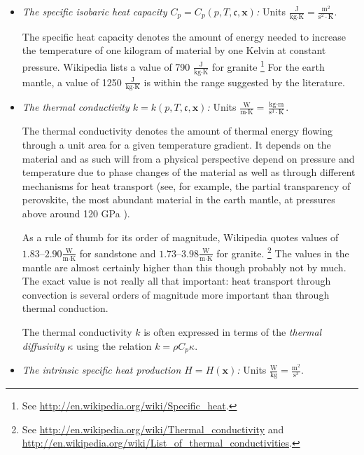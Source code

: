\documentclass{article}
\begin{document}
\begin{itemize}
\item \textit{The specific isobaric heat capacity $C_p=C_p(p,T,\mathfrak c,\mathbf x)$:}
Units $\frac{\textrm{J}}{\textrm{kg}\cdot\textrm{K}} =
  \frac{\textrm{m}^2}{\textrm{s}^2\cdot\textrm{K}}$.

  The specific heat capacity denotes the amount of energy needed to increase
  the temperature of one kilogram of material by one Kelvin at constant pressure.
  Wikipedia lists a value of
  790 $\frac{\textrm{J}}{\textrm{kg}\cdot\textrm{K}}$ for granite%
  \footnote{See \url{http://en.wikipedia.org/wiki/Specific_heat}.}
  For the earth mantle, a value of 1250
  $\frac{\textrm{J}}{\textrm{kg}\cdot\textrm{K}}$ is within the range
  suggested by the literature.


\item \textit{The thermal conductivity $k=k(p,T,\mathfrak c,\mathbf x)$:} Units
  $\frac{\textrm{W}}{\textrm{m}\cdot\textrm{K}}=\frac{\textrm{kg}\cdot\textrm{m}}{\textrm{s}^3\cdot\textrm{K}}$.

  The thermal conductivity denotes the amount of thermal energy flowing
  through a unit area for a given temperature gradient. It depends on the
  material and as such will from a physical perspective depend on pressure and
  temperature due to phase changes of the material as well as through
  different mechanisms for heat transport (see, for example, the partial
  transparency of perovskite, the most abundant
  material in the earth mantle, at pressures above around 120 GPa
  \cite{BRVMFG04}).

  As a rule of thumb for its
  order of magnitude, Wikipedia quotes values of
  $1.83$--$2.90\frac{\textrm{W}}{\textrm{m}\cdot\textrm{K}}$ for sandstone and
  $1.73$--$3.98\frac{\textrm{W}}{\textrm{m}\cdot\textrm{K}}$ for granite.%
  \footnote{See \url{http://en.wikipedia.org/wiki/Thermal_conductivity} and
    \url{http://en.wikipedia.org/wiki/List_of_thermal_conductivities}.} The
  values in the mantle are almost certainly higher than this though probably
  not by much. The exact value is not really all that important: heat
  transport through convection is several orders of magnitude more important
  than through thermal conduction.

  The thermal conductivity $k$ is often expressed in terms of the
  \textit{thermal diffusivity} $\kappa$ using the relation $k = \rho C_p \kappa$.

\item \textit{The intrinsic specific heat production $H=H(\mathbf x)$:} Units
  $\frac{\textrm{W}}{\textrm{kg}}=\frac{\textrm{m}^2}{\textrm{s}^3}$.


\end{itemize}
\end{document}
